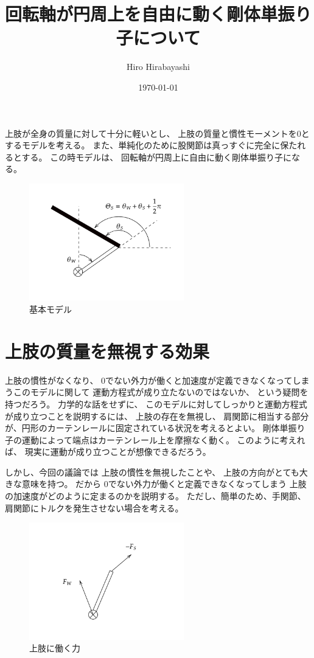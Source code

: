 \documentclass[a4paper,11pt]{jsarticle}
\begin{document}
\title{回転軸が円周上を自由に動く剛体単振り子について}
\author{Hiro Hirabayashi}
\date{\today}
\maketitle


上肢が全身の質量に対して十分に軽いとし、
上肢の質量と慣性モーメントを$0$とするモデルを考える。
また、単純化のために股関節は真っすぐに完全に保たれるとする。
この時モデルは、
回転軸が円周上に自由に動く剛体単振り子になる。

\begin{figure}[h]
  \centering
  \includegraphics[width = 0.6\textwidth]{config.png}
  \caption{基本モデル}
  \label{config.png}
\end{figure}

\section{上肢の質量を無視する効果}

上肢の慣性がなくなり、
0でない外力が働くと加速度が定義できなくなってしまうこのモデルに関して
運動方程式が成り立たないのではないか、
という疑問を持つだろう。
力学的な話をせずに、
このモデルに対してしっかりと運動方程式が成り立つことを説明するには、
上肢の存在を無視し、
肩関節に相当する部分が、円形のカーテンレールに固定されている状況を考えるとよい。
剛体単振り子の運動によって端点はカーテンレール上を摩擦なく動く。
このように考えれば、
現実に運動が成り立つことが想像できるだろう。

しかし、今回の議論では
上肢の慣性を無視したことや、
上肢の方向がとても大きな意味を持つ。
だから
0でない外力が働くと定義できなくなってしまう
上肢の加速度がどのように定まるのかを説明する。
ただし、簡単のため、手関節、肩関節にトルクを発生させない場合を考える。

\begin{figure}[h]
  \centering
  \includegraphics[width = 0.6\textwidth]{F_arm_config.png}
  \caption{上肢に働く力}
  \label{F_arm_config.png}
\end{figure}
\end{document}

